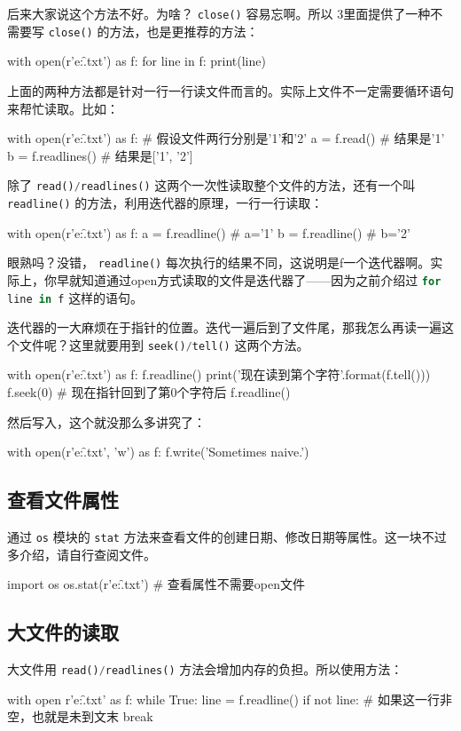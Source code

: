 \documentclass[a4paper,12pt]{report}
\newcommand{\pyline}[1]{{ \lstinline[language=Python, basicstyle=\ttfamily]{#1} }}
\newcommand{\python}{{\ttfamily{Python}}}
\newcommand{\mytt}[1]{{\ttfamily{#1}}}
\begin{document}
后来大家说这个方法不好。为啥？\pyline{close()}容易忘啊。所以\python{} 3里面提供了一种不需要写\pyline{close()}的方法，也是更推荐的方法：
\begin{py}
with open(r'e:\f.txt') as f:
    for line in f:
        print(line)
\end{py}

上面的两种方法都是针对一行一行读文件而言的。实际上文件不一定需要循环语句来帮忙读取。比如：
\begin{py}
with open(r'e:\f.txt') as f: # 假设文件两行分别是'1'和'2'
    a = f.read() # 结果是'1'
    b = f.readlines() # 结果是['1\n', '2']
\end{py}

除了\pyline{read()/readlines()}这两个一次性读取整个文件的方法，还有一个叫\pyline{readline()}的方法，利用迭代器的原理，一行一行读取：
\begin{py}
with open(r'e:\f.txt') as f:
    a = f.readline() # a='1\n'
    b = f.readline() # b='2'
\end{py}

眼熟吗？没错，\pyline{readline()}每次执行的结果不同，这说明是f一个迭代器啊。实际上，你早就知道通过open方式读取的文件是迭代器了——因为之前介绍过\pyline{for line in f}这样的语句。

迭代器的一大麻烦在于指针的位置。迭代一遍后到了文件尾，那我怎么再读一遍这个文件呢？这里就要用到\pyline{seek()/tell()}这两个方法。
\begin{py}
with open(r'e:\f.txt') as f:
    f.readline()
    print('现在读到第{}个字符'.format(f.tell()))
    f.seek(0) # 现在指针回到了第0个字符后
    f.readline()
\end{py}

然后写入，这个就没那么多讲究了：
\begin{py}
with open(r'e:\f.txt', 'w') as f:
    f.write('Sometimes naive.')
\end{py}

\subsection{查看文件属性}
通过\pyline{os}模块的\pyline{stat}方法来查看文件的创建日期、修改日期等属性。这一块不过多介绍，请自行查阅文件。
\begin{py}
import os
os.stat(r'e:\f.txt') # 查看属性不需要open文件
\end{py}

\subsection{大文件的读取}
大文件用\pyline{read()/readlines()}方法会增加内存的负担。所以使用\mytt{readline()}方法：
\begin{py}
with open r'e:\f.txt' as f:
    while True:
        line = f.readline()
        if not line: # 如果这一行非空，也就是未到文末
            break  
\end{py}
\end{document}
